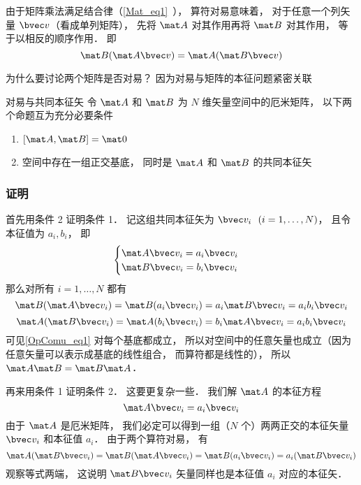

由于矩阵乘法满足结合律（\autoref{Mat_eq1}~）， 算符对易意味着， 对于任意一个列矢量 $\bvec v$（看成单列矩阵）， 先将 $\mat A$ 对其作用再将 $\mat B$ 对其作用， 等于以相反的顺序作用． 即
\begin{equation}\label{OpComu_eq1}
\mat B(\mat A \bvec v) = \mat A (\mat B \bvec v)
\end{equation}

为什么要讨论两个矩阵是否对易？ 因为对易与矩阵的本征问题紧密关联

\begin{theorem}{对易与共同本征矢}
令 $\mat A$ 和 $\mat B$ 为 $N$ 维矢量空间中的厄米矩阵， 以下两个命题互为充分必要条件
\begin{enumerate}
\item $[\mat A, \mat B] = \mat 0$
\item 空间中存在一组正交基底， 同时是 $\mat A$ 和 $\mat B$ 的共同本征矢
\end{enumerate}
\end{theorem}

\subsubsection{证明}
首先用条件 2 证明条件 1． 记这组共同本征矢为 $\bvec v_i \ \ (i = 1, \dots , N)$， 且令本征值为 $a_i, b_i$， 即
\begin{equation}
\begin{cases}
\mat A \bvec v_i = a_i \bvec v_i\\
\mat B \bvec v_i = b_i \bvec v_i
\end{cases}
\end{equation}
那么对所有 $i = 1, \dots, N$ 都有
\begin{equation}
\mat B (\mat A \bvec v_i) = \mat B (a_i \bvec v_i) = a_i \mat B \bvec v_i = a_i b_i \bvec v_i
\end{equation}
\begin{equation}
\mat A (\mat B \bvec v_i) = \mat A (b_i \bvec v_i) = b_i \mat A \bvec v_i = a_i b_i \bvec v_i
\end{equation}
可见\autoref{OpComu_eq1} 对每个基底都成立， 所以对空间中的任意矢量也成立（因为任意矢量可以表示成基底的线性组合， 而算符都是线性的）， 所以 $\mat A \mat B = \mat B \mat A$．

再来用条件 1 证明条件 2． 这要更复杂一些． 我们解 $\mat A$ 的本征方程
\begin{equation}\label{OpComu_eq2}
\mat A \bvec v_i = a_i \bvec v_i
\end{equation}
由于 $\mat A$ 是厄米矩阵， 我们必定可以得到一组（$N$ 个）两两正交的本征矢量 $\bvec v_i$ 和本征值 $a_i$． 由于两个算符对易， 有
\begin{equation}\label{OpComu_eq3}
\mat A (\mat B \bvec v_i) = \mat B (\mat A \bvec v_i) = \mat B (a_i \bvec v_i) = a_i (\mat B \bvec v_i)
\end{equation}
观察等式两端， 这说明 $\mat B \bvec v_i$ 矢量同样也是本征值 $a_i$ 对应的本征矢．

